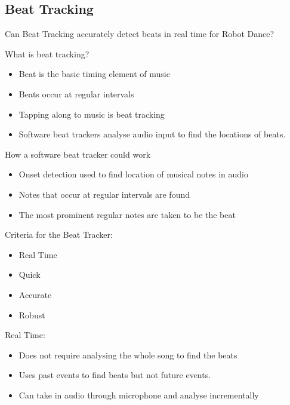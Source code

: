 \documentclass{beamer}
\begin{document}
	\subsection{Beat Tracking}
	\begin{frame}
		\subsectionpage
	\end{frame}
	\begin{frame}
		Can Beat Tracking accurately detect beats in real time for Robot Dance?
	\end{frame}
	\begin{frame}
		What is beat tracking?
		\begin{itemize}
			\item Beat is the basic timing element of music
			\item Beats occur at regular intervals
			\item Tapping along to music is beat tracking
			\item Software beat trackers analyse audio input to find the locations of beats.
		\end{itemize}
	\end{frame}
	\begin{frame}
		How a software beat tracker could work
		\begin{itemize}
			\item Onset detection used to find location of musical notes in audio
			\item Notes that occur at regular intervals are found
			\item The most prominent regular notes are taken to be the beat
		\end{itemize}
	\end{frame}
	\begin{frame}
		Criteria for the Beat Tracker:
		\begin{itemize}
			\item Real Time %
			\item Quick %
			\item Accurate %
			\item Robust	%
		\end{itemize}
	\end{frame}
	\begin{frame}
		Real Time:
		\begin{itemize}
			\item Does not require analysing the whole song to find the beats
			\item Uses past events to find beats but not future events.
			\item Can take in audio through microphone and analyse incrementally
		\end{itemize}		
	\end{frame}
\end{document}
